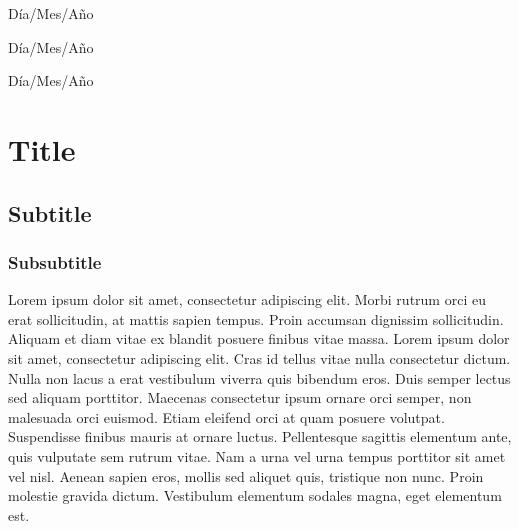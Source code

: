 \documentclass{uc3mpracticas}
\begin{document}
  \frontmatter



  \begin{center}
    \large Día/Mes/Año
  \end{center}

  \vspace{40mm}


  \newpage


  \begin{center}
    \large Día/Mes/Año
  \end{center}

  \newpage


  \begin{center}
    \large Día/Mes/Año
  \end{center}

  \newpage

  \tableofcontents

  \newpage

  \mainmatter

  \section{Title}
  \subsection{Subtitle}
  \subsubsection{Subsubtitle}

  Lorem ipsum dolor sit amet, consectetur adipiscing elit. Morbi rutrum orci eu erat sollicitudin, at mattis sapien tempus. Proin accumsan dignissim sollicitudin. Aliquam et diam vitae ex blandit posuere finibus vitae massa. Lorem ipsum dolor sit amet, consectetur adipiscing elit. Cras id tellus vitae nulla consectetur dictum. Nulla non lacus a erat vestibulum viverra quis bibendum eros. Duis semper lectus sed aliquam porttitor. Maecenas consectetur ipsum ornare orci semper, non malesuada orci euismod. Etiam eleifend orci at quam posuere volutpat. Suspendisse finibus mauris at ornare luctus. Pellentesque sagittis elementum ante, quis vulputate sem rutrum vitae. Nam a urna vel urna tempus porttitor sit amet vel nisl. Aenean sapien eros, mollis sed aliquet quis, tristique non nunc. Proin molestie gravida dictum. Vestibulum elementum sodales magna, eget elementum est.
\end{document}
